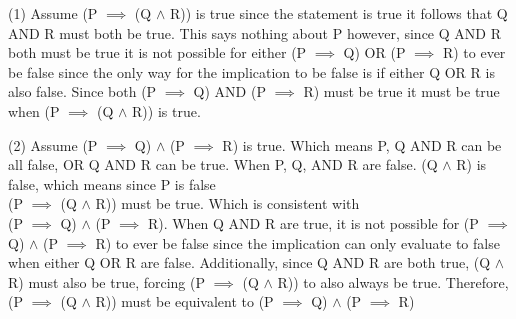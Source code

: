\documentclass[11pt]{article}
\begin{document}
\begin{flushleft}
\begin{enumerate}[widest={5.2}]
(1) Assume (P $\implies$ (Q $\wedge$ R)) is true since the statement is true it follows that Q AND R must both be true. This says nothing about P however, since Q AND R both must be true it is not possible for either (P $\implies$ Q) OR (P $\implies$ R) to ever be false since the only way for the implication to be false is if either Q OR R is also false. Since both (P $\implies$ Q) AND (P $\implies$ R) must be true it must be true when (P $\implies$ (Q $\wedge$ R)) is true.
\smallskip

(2) Assume (P $\implies$ Q) $\wedge$ (P $\implies$ R) is true. Which means P, Q AND R can be all false, OR Q AND R can be true. When P, Q, AND R are false. (Q $\wedge$ R) is false, which means since P is false\\ (P $\implies$ (Q $\wedge$ R)) must be true. Which is consistent with\\ (P $\implies$ Q) $\wedge$ (P $\implies$ R). When Q AND R are true, it is not possible for (P $\implies$ Q) $\wedge$ (P $\implies$ R) to ever be false since the implication can only evaluate to false when either Q OR R are false. Additionally, since Q AND R are both true, (Q $\wedge$ R) must also be true, forcing (P $\implies$ (Q $\wedge$ R)) to also always be true. Therefore,\\ (P $\implies$ (Q $\wedge$ R)) must be equivalent to (P $\implies$ Q) $\wedge$ (P $\implies$ R)
\end{enumerate}
 
 
\end{flushleft}
\end{document}
